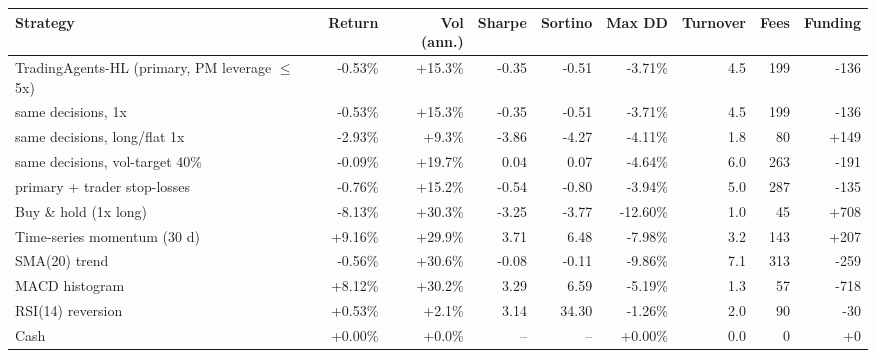 \begin{tabular}{lrrrrrrrr}
\toprule
Strategy & Return & Vol (ann.) & Sharpe & Sortino & Max DD & Turnover & Fees & Funding \\
\midrule
TradingAgents-HL (primary, PM leverage $\le$5x) & -0.53\% & +15.3\% & -0.35 & -0.51 & -3.71\% & 4.5 & 199 & -136 \\
\quad same decisions, 1x & -0.53\% & +15.3\% & -0.35 & -0.51 & -3.71\% & 4.5 & 199 & -136 \\
\quad same decisions, long/flat 1x & -2.93\% & +9.3\% & -3.86 & -4.27 & -4.11\% & 1.8 & 80 & +149 \\
\quad same decisions, vol-target 40\% & -0.09\% & +19.7\% & 0.04 & 0.07 & -4.64\% & 6.0 & 263 & -191 \\
\quad primary + trader stop-losses & -0.76\% & +15.2\% & -0.54 & -0.80 & -3.94\% & 5.0 & 287 & -135 \\
\midrule
Buy \& hold (1x long) & -8.13\% & +30.3\% & -3.25 & -3.77 & -12.60\% & 1.0 & 45 & +708 \\
Time-series momentum (30 d) & +9.16\% & +29.9\% & 3.71 & 6.48 & -7.98\% & 3.2 & 143 & +207 \\
SMA(20) trend & -0.56\% & +30.6\% & -0.08 & -0.11 & -9.86\% & 7.1 & 313 & -259 \\
MACD histogram & +8.12\% & +30.2\% & 3.29 & 6.59 & -5.19\% & 1.3 & 57 & -718 \\
RSI(14) reversion & +0.53\% & +2.1\% & 3.14 & 34.30 & -1.26\% & 2.0 & 90 & -30 \\
Cash & +0.00\% & +0.0\% & -- & -- & +0.00\% & 0.0 & 0 & +0 \\
\bottomrule
\end{tabular}